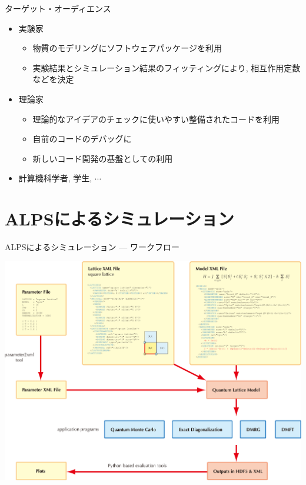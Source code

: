 \begin{frame}{ターゲット・オーディエンス}
  \begin{itemize}
    \setlength{\itemsep}{1em}
  \item 実験家
    \begin{itemize}
    \item 物質のモデリングにソフトウェアパッケージを利用
    \item 実験結果とシミュレーション結果のフィッティングにより, 相互作用定数などを決定
    \end{itemize}
  \item 理論家
    \begin{itemize}
    \item 理論的なアイデアのチェックに使いやすい整備されたコードを利用
    \item 自前のコードのデバッグに
    \item 新しいコード開発の基盤としての利用
    \end{itemize}
  \item 計算機科学者, 学生, $\cdots$
  \end{itemize}
\end{frame}

\section{ALPSによるシミュレーション}

\begin{frame}{ALPSによるシミュレーション --- ワークフロー}
  \begin{center}
    \includegraphics[height=0.8\textheight]{workflow.pdf}
  \end{center}
\end{frame}

